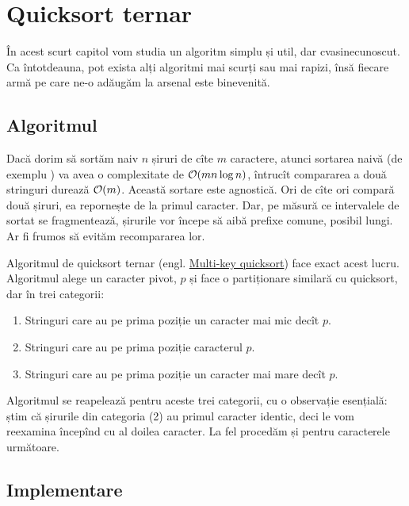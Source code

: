 \documentclass[../main.tex]{subfiles}
\begin{document}
\chapter{Quicksort ternar}
\label{chapter:ternary-sort}

În acest scurt capitol vom studia un algoritm simplu și util, dar cvasinecunoscut. Ca întotdeauna, pot exista alți algoritmi mai scurți sau mai rapizi, însă fiecare armă pe care ne-o adăugăm la arsenal este binevenită.

\section{Algoritmul}

Dacă dorim să sortăm naiv $n$ șiruri de cîte $m$ caractere, atunci sortarea naivă (de exemplu ) va avea o complexitate de $\mathcal{O}(mn \log n)$, întrucît compararea a două stringuri durează $\mathcal{O}(m)$. Această sortare este agnostică. Ori de cîte ori compară două șiruri, ea repornește de la primul caracter. Dar, pe măsură ce intervalele de sortat se fragmentează, șirurile vor începe să aibă prefixe comune, posibil lungi. Ar fi frumos să evităm recompararea lor.

Algoritmul de quicksort ternar (engl. \href{https://en.wikipedia.org/wiki/Multi-key_quicksort}{Multi-key quicksort}) face exact acest lucru. Algoritmul alege un caracter pivot, $p$ și face o partiționare similară cu quicksort, dar în trei categorii:

\begin{enumerate}
  \item Stringuri care au pe prima poziție un caracter mai mic decît $p$.
  \item Stringuri care au pe prima poziție caracterul $p$.
  \item Stringuri care au pe prima poziție un caracter mai mare decît $p$.
\end{enumerate}

Algoritmul se reapelează pentru aceste trei categorii, cu o observație esențială: știm că șirurile din categoria (2) au primul caracter identic, deci le vom reexamina începînd cu al doilea caracter. La fel procedăm și pentru caracterele următoare.

\section{Implementare}
\end{document}
